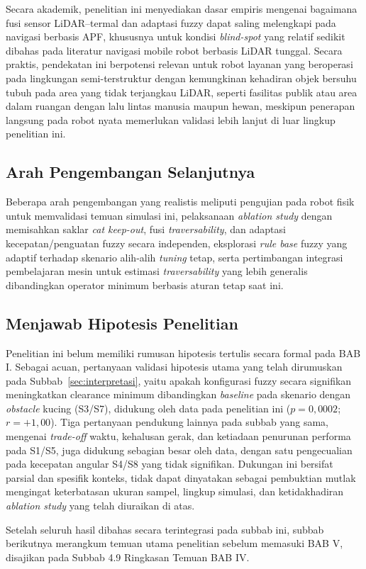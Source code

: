 Secara akademik, penelitian ini menyediakan dasar empiris mengenai bagaimana
fusi sensor LiDAR--termal dan adaptasi fuzzy dapat saling melengkapi pada
navigasi berbasis APF, khususnya untuk kondisi \textit{blind-spot} yang
relatif sedikit dibahas pada literatur navigasi mobile robot berbasis LiDAR
tunggal. Secara praktis, pendekatan ini berpotensi relevan untuk robot
layanan yang beroperasi pada lingkungan semi-terstruktur dengan kemungkinan
kehadiran objek bersuhu tubuh pada area yang tidak terjangkau LiDAR, seperti
fasilitas publik atau area dalam ruangan dengan lalu lintas manusia maupun
hewan, meskipun penerapan langsung pada robot nyata memerlukan validasi
lebih lanjut di luar lingkup penelitian ini.

\subsection{Arah Pengembangan Selanjutnya}

Beberapa arah pengembangan yang realistis meliputi pengujian pada robot
fisik untuk memvalidasi temuan simulasi ini, pelaksanaan \textit{ablation
study} dengan memisahkan saklar \textit{cat keep-out}, fusi
\textit{traversability}, dan adaptasi kecepatan/penguatan fuzzy secara
independen, eksplorasi \textit{rule base} fuzzy yang adaptif terhadap
skenario alih-alih \textit{tuning} tetap, serta pertimbangan integrasi
pembelajaran mesin untuk estimasi \textit{traversability} yang lebih
generalis dibandingkan operator minimum berbasis aturan tetap saat ini.

\subsection{Menjawab Hipotesis Penelitian}

Penelitian ini belum memiliki rumusan hipotesis tertulis secara formal pada
BAB I. Sebagai acuan, pertanyaan validasi hipotesis utama yang telah
dirumuskan pada Subbab~\ref{sec:interpretasi}, yaitu apakah konfigurasi
fuzzy secara signifikan meningkatkan clearance minimum dibandingkan
\textit{baseline} pada skenario dengan \textit{obstacle} kucing (S3/S7),
didukung oleh data pada penelitian ini ($p=0,0002$; $r=+1,00$). Tiga
pertanyaan pendukung lainnya pada subbab yang sama, mengenai \textit{trade-off}
waktu, kehalusan gerak, dan ketiadaan penurunan performa pada S1/S5, juga
didukung sebagian besar oleh data, dengan satu pengecualian pada kecepatan
angular S4/S8 yang tidak signifikan. Dukungan ini bersifat parsial dan
spesifik konteks, tidak dapat dinyatakan sebagai pembuktian mutlak mengingat
keterbatasan ukuran sampel, lingkup simulasi, dan ketidakhadiran
\textit{ablation study} yang telah diuraikan di atas.

Setelah seluruh hasil dibahas secara terintegrasi pada subbab ini, subbab
berikutnya merangkum temuan utama penelitian sebelum memasuki BAB V,
disajikan pada Subbab 4.9 Ringkasan Temuan BAB IV.
